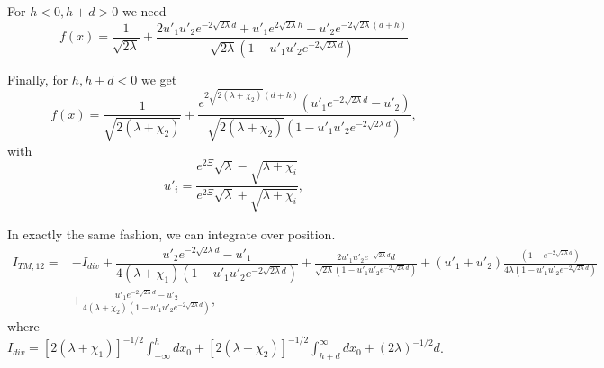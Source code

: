\begin{itemize}
For $h<0, h+d>0$ we need 
\begin{equation}
f(x) = \frac{1}{\sqrt{2\lambda}} + \frac{2u'_1u'_2 e^{-2\sqrt{2\lambda}d} + u'_1 e^{2\sqrt{2\lambda}h} +u'_2 e^{-2\sqrt{2\lambda}(d+h)}}{\sqrt{2\lambda}(1-u'_1u'_2 e^{-2\sqrt{2\lambda}d})}
\end{equation}

Finally, for $h,h+d<0$ we get 
\begin{equation}
f(x) =  \frac{1}{\sqrt{2(\lambda+\chi_2)}} + \frac{e^{2\sqrt{2(\lambda+\chi_2)}(d+h)}(u'_1 e^{-2\sqrt{2\lambda}d} - u'_2)}{\sqrt{2(\lambda+\chi_2)}(1-u'_1u'_2 e^{-2\sqrt{2\lambda}d})},
\end{equation}
with 
\begin{equation}
u'_i = \frac{e^{2\Xi}\sqrt{\lambda} -\sqrt{\lambda+\chi_i}}{e^{2\Xi}\sqrt{\lambda} + \sqrt{\lambda+\chi_i}},
\end{equation}

In exactly the same fashion, we can integrate over position.  
\begin{align}
I_{TM,12} =& -I_{div} + \dfrac{u'_2 e^{-2\sqrt{2\lambda}d}-u'_1}{4(\lambda+\chi_1)(1-u'_1u'_2 e^{-2\sqrt{2\lambda}d})} +\frac{2u'_1u'_2 e^{-\sqrt{2\lambda}d}d}{\sqrt{2\lambda}(1-u'_1u'_2 e^{-2\sqrt{2\lambda}d})} + (u'_1+u'_2)\frac{(1-e^{-2\sqrt{2\lambda}d})}{4\lambda(1-u'_1u'_2e^{-2\sqrt{2\lambda}d})}\nonumber\\
& +\frac{u'_1 e^{-2\sqrt{2\lambda}d} - u'_2}{4(\lambda+\chi_2)(1-u'_1u'_2 e^{-2\sqrt{2\lambda}d})},
\end{align}
where $I_{div} = [2(\lambda+\chi_1)]^{-1/2}\int_{-\infty}^h dx_0  +  [2(\lambda+\chi_2)]^{-1/2}\int_{h+d}^\infty dx_0  + (2\lambda)^{-1/2}d$.

\end{itemize}





